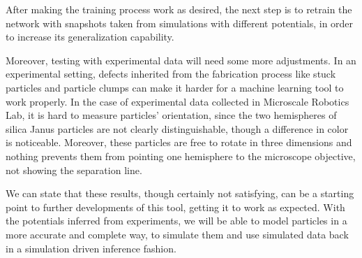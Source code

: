 \documentclass[../../master_thesis_np.tex]{subfiles}
\begin{document}
After making the training process work as desired, the next step is to retrain the network with snapshots taken from simulations with different potentials, in order to increase its generalization capability.

Moreover, testing with experimental data will need some more adjustments.
In an experimental setting, defects inherited from the fabrication process like stuck particles and particle clumps can make it harder for a machine learning tool to work properly.
In the case of experimental data collected in Microscale Robotics Lab, it is hard to measure particles' orientation, since the two hemispheres of silica Janus particles are not clearly distinguishable, though a difference in color is noticeable.
Moreover, these particles are free to rotate in three dimensions and nothing prevents them from pointing one hemisphere to the microscope objective, not showing the separation line.

We can state that these results, though certainly not satisfying, can be a starting point to further developments of this tool, getting it to work as expected.
With the potentials inferred from experiments, we will be able to model particles in a more accurate and complete way, to simulate them and use simulated data back in a simulation driven inference fashion.
\end{document}
